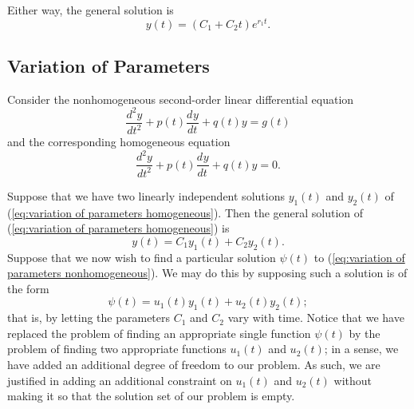 \documentclass{myart}
\newcommand{\eq}[1]{(\ref{eq:#1})}
\newcommand{\deriv}[3][]{\frac{d^{#1}#2}{d#3^{#1}}}
\begin{document}
Either way, the general solution is
\begin{equation*}
  y(t) = (C_1 + C_2t)e^{r_1t}.
\end{equation*}

\subsection{Variation of Parameters}
\label{subsec:variation of parameters}

Consider the nonhomogeneous second-order linear differential equation
\begin{equation} \label{eq:variation of parameters nonhomogeneous}
  \deriv[2]{y}{t} + p(t) \deriv{y}{t} + q(t)y = g(t)
\end{equation}
and the corresponding homogeneous equation
\begin{equation} \label{eq:variation of parameters homogeneous}
  \deriv[2]{y}{t} + p(t) \deriv{y}{t} + q(t)y = 0.
\end{equation}

Suppose that we have two linearly independent solutions $y_1(t)$ and
$y_2(t)$ of \eq{variation of parameters homogeneous}. Then the general
solution of \eq{variation of parameters homogeneous} is
\begin{equation*}
  y(t) = C_1y_1(t) + C_2y_2(t).
\end{equation*}
Suppose that we now wish to find a particular solution $\psi(t)$ to
\eq{variation of parameters nonhomogeneous}. We may do this by
supposing such a solution is of the form
\begin{equation}
  \psi(t) = u_1(t)y_1(t) + u_2(t)y_2(t);
\end{equation}
that is, by letting the parameters $C_1$ and $C_2$ vary with time.
Notice that we have replaced the problem of finding an appropriate
single function $\psi(t)$ by the problem of finding two appropriate
functions $u_1(t)$ and $u_2(t)$; in a sense, we have added an
additional degree of freedom to our problem. As such, we are justified
in adding an additional constraint on $u_1(t)$ and $u_2(t)$ without
making it so that the solution set of our problem is empty.
\end{document}

